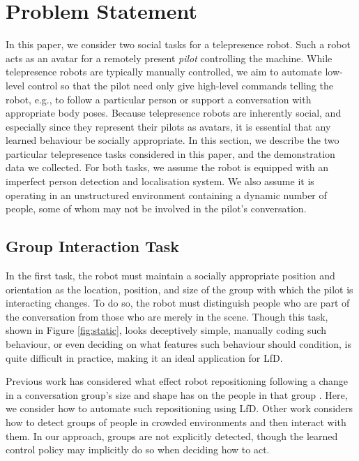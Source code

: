 \documentclass[letterpaper, 10 pt, conference]{ieeeconf}
\begin{document}
\section{Problem Statement \label{sec:related_work}}

In this paper, we consider two social tasks for a telepresence robot.  Such a robot acts as an avatar for a remotely present \emph{pilot} controlling the machine.  While telepresence robots are typically manually controlled, we aim to automate low-level control so that the pilot need only give high-level commands telling the robot, e.g., to follow a particular person or support a conversation with appropriate body poses.  Because telepresence robots are inherently social, and especially since they represent their pilots as avatars, it is essential that any learned behaviour be socially appropriate. In this section, we describe the two particular telepresence tasks considered in this paper, and the demonstration data we collected.  For both tasks, we assume the robot is equipped with an imperfect person detection and localisation system.  We also assume it is operating in an unstructured environment containing a dynamic number of people, some of whom may not be involved in the pilot's conversation.

\vspace{-1mm}
\subsection{Group Interaction Task} 

In the first task, the robot must maintain a socially appropriate position and orientation as the location, position, and size of the group with which the pilot is interacting changes.  To do so, the robot must distinguish people who are part of the conversation from those who are merely in the scene. Though this task, shown in Figure \ref{fig:static}, looks deceptively simple, manually coding such behaviour, or even deciding on what features such behaviour should condition, is quite difficult in practice, making it an ideal application for LfD.

Previous work has considered what effect robot repositioning following a change in a conversation group's size and shape has on the people in that group \cite{kuzuoka2010reconfiguring,vroon2015dynamics}. Here, we consider how to automate such repositioning using LfD.  Other work considers how to detect groups of people in crowded environments \cite{lau2010multi} and then interact with them.  In our approach, groups are not explicitly detected, though the learned control policy may implicitly do so when deciding how to act.
\end{document}
